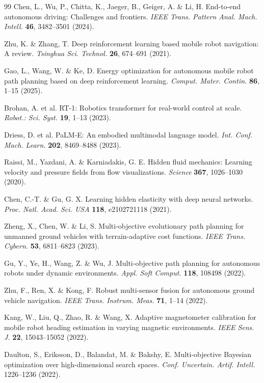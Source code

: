 \documentclass[pdflatex,sn-nature]{sn-jnl}%
\begin{document}
\begin{thebibliography}{99}
Chen, L., Wu, P., Chitta, K., Jaeger, B., Geiger, A. \& Li, H. End-to-end autonomous driving: Challenges and frontiers. \textit{IEEE Trans. Pattern Anal. Mach. Intell.} \textbf{46}, 3482--3501 (2024).

Zhu, K. \& Zhang, T. Deep reinforcement learning based mobile robot navigation: A review. \textit{Tsinghua Sci. Technol.} \textbf{26}, 674--691 (2021).

Gao, L., Wang, W. \& Ke, D. Energy optimization for autonomous mobile robot path planning based on deep reinforcement learning.
\textit{Comput. Mater. Contin.} \textbf{86}, 1--15 (2025).

Brohan, A. et al. {RT-1}: Robotics transformer for real-world control at scale. \textit{Robot.: Sci. Syst.} \textbf{19}, 1--13 (2023).

Driess, D. et al. {PaLM-E}: An embodied multimodal language model. \textit{Int. Conf. Mach. Learn.} \textbf{202}, 8469--8488 (2023).

Raissi, M., Yazdani, A. \& Karniadakis, G. E. Hidden fluid mechanics: Learning velocity and pressure fields from flow visualizations. \textit{Science} \textbf{367}, 1026--1030 (2020).

Chen, C.-T. \& Gu, G. X. Learning hidden elasticity with deep neural networks. \textit{Proc. Natl. Acad. Sci. USA} \textbf{118}, e2102721118 (2021).

Zheng, X., Chen, W. \& Li, S. Multi-objective evolutionary path planning for unmanned ground vehicles with terrain-adaptive cost functions. \textit{IEEE Trans. Cybern.} \textbf{53}, 6811--6823 (2023).

Gu, Y., Ye, H., Wang, Z. \& Wu, J. Multi-objective path planning for autonomous robots under dynamic environments. \textit{Appl. Soft Comput.} \textbf{118}, 108498 (2022).

Zhu, F., Ren, X. \& Kong, F. Robust multi-sensor fusion for autonomous ground vehicle navigation. \textit{IEEE Trans. Instrum. Meas.} \textbf{71}, 1--14 (2022).

Kang, W., Liu, Q., Zhao, R. \& Wang, X. Adaptive magnetometer calibration for mobile robot heading estimation in varying magnetic environments. \textit{IEEE Sens. J.} \textbf{22}, 15043--15052 (2022).

Daulton, S., Eriksson, D., Balandat, M. \& Bakshy, E. Multi-objective Bayesian optimization over high-dimensional search spaces. \textit{Conf. Uncertain. Artif. Intell.} 1226--1236 (2022).


\end{thebibliography}
\end{document}
